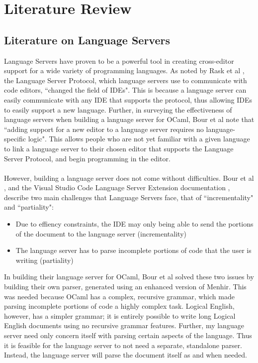 \documentclass[../main.tex]{subfiles}
\begin{document}
\chapter{Literature Review}
\section{Literature on Language Servers}
Language Servers have proven to be a powerful tool in creating cross-editor support for a wide variety of programming languages. As noted by Rask et al \cite[]{standardised_lsp_extensions}, the Language Server Protocol, which language servers use to communicate with code editors, ``changed the field of IDEs". This is because a language server can easily communicate with any IDE that supports the protocol, thus allowing IDEs to easily support a new language. Further, in surveying the effectiveness of language servers when building a language server for OCaml, Bour et al \cite[]{merlin_experience_report} note that ``adding support for a new editor to a language server requires no language-specific logic". This allows people who are not yet familiar with a given language to link a language server to their chosen editor that supports the Language Server Protocol, and begin programming in the editor. 
\\ \\
However, building a language server does not come without difficulties. Bour et al \cite[]{merlin_experience_report}, and the Visual Studio Code Language Server Extension documentation \cite[]{vsc_langserver_docs}, describe two main challenges that Language Servers face, that of ``incrementality" and ``partiality":
\begin{itemize}
    \item Due to effiency constraints, the IDE may only being able to send the portions of the document to the language server (incrementality)
    \item The language server has to parse incomplete portions of code that the user is writing (partiality)
\end{itemize}
In building their language server for OCaml, Bour et al solved these two issues by building their own parser, generated using an enhanced version of Menhir. This was needed because OCaml has a complex, recursive grammar, which made parsing incomplete portions of code a highly complex task. Logical English, however, has a simpler grammar; it is entirely possible to write long Logical English documents using no recursive grammar features. Further, my language server need only concern itself with parsing certain aspects of the language. Thus it is feasible for the language server to not need a separate, standalone parser. Instead, the language server will parse the document itself as and when needed.
\end{document}
